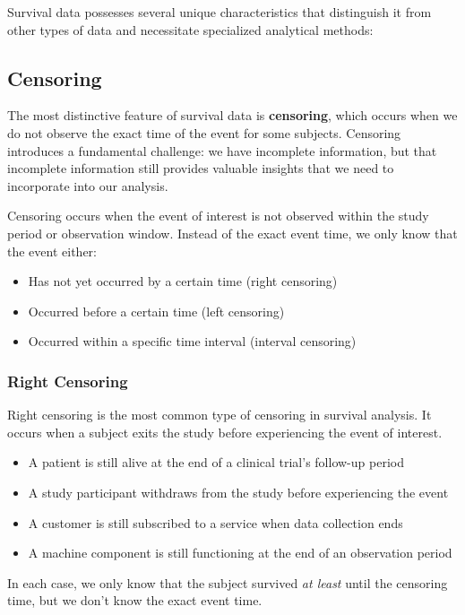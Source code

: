 Survival data possesses several unique characteristics that distinguish it from other types of data and necessitate specialized analytical methods:

\subsection{Censoring}

The most distinctive feature of survival data is \textbf{censoring}, which occurs when we do not observe the exact time of the event for some subjects. Censoring introduces a fundamental challenge: we have incomplete information, but that incomplete information still provides valuable insights that we need to incorporate into our analysis.

\begin{definitionbox}[title=Censoring]
Censoring occurs when the event of interest is not observed within the study period or observation window. Instead of the exact event time, we only know that the event either:
\begin{itemize}
    \item Has not yet occurred by a certain time (right censoring)
    \item Occurred before a certain time (left censoring)
    \item Occurred within a specific time interval (interval censoring)
\end{itemize}
\end{definitionbox}

\subsubsection{Right Censoring}

Right censoring is the most common type of censoring in survival analysis. It occurs when a subject exits the study before experiencing the event of interest.

\begin{examplebox}[title=Examples of Right Censoring]
\begin{itemize}
    \item A patient is still alive at the end of a clinical trial's follow-up period
    \item A study participant withdraws from the study before experiencing the event
    \item A customer is still subscribed to a service when data collection ends
    \item A machine component is still functioning at the end of an observation period
\end{itemize}

In each case, we only know that the subject survived \textit{at least} until the censoring time, but we don't know the exact event time.
\end{examplebox}

